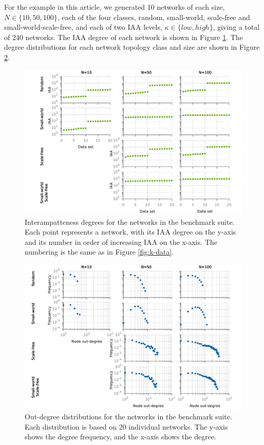\begin{bibunit}
For the example in this article, we generated 10 networks of each size, \(N\in \{10,50,100\}\), each of the four classes, random, small-world, scale-free and small-world-scale-free, and each of two IAA levels, \(\kappa \in \{low,high\}\), giving a total of 240 networks.
The IAA degree of each network is shown in Figure \ref{fig:iaa}.
The degree distributions for each network topology class and size are shown in Figure \ref{fig:out-degree}.
\begin{figure}
[!htbp]
\centering
\includegraphics[width=.7\linewidth]{img/iaa_networks}
\captionsetup{width=.7\textwidth}
\caption{Interampatteness degrees for the networks in the benchmark suite. Each point represents a network, with its IAA degree on the y-axis and its number in order of increasing IAA on the x-axis. The numbering is the same as in Figure \ref{fig:k-data}.}
\label{fig:iaa}
\end{figure}

\begin{figure}
[!htbp]
\centering
\includegraphics[width=.7\linewidth]{img/degree_distributions}
\captionsetup{width=.7\textwidth}
\caption{Out-degree distributions for the networks in the benchmark suite. Each distribution is based on 20 individual networks. The y-axis shows the degree frequency, and the x-axis shows the degree.}
\label{fig:out-degree}
\end{figure}


\end{bibunit}
